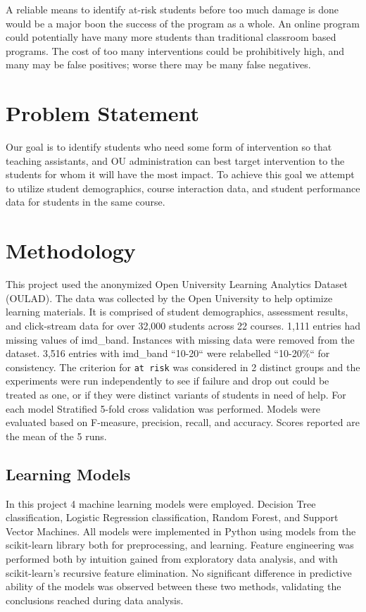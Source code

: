 \documentclass{article}
\begin{document}
A reliable means to identify at-risk students before too much
damage is done would be a major boon the success of the program as a whole. An online program could potentially 
have many more students than traditional classroom based programs. The cost of too many interventions could be 
prohibitively high, and many may be false positives; worse there may be many false negatives.

\section{Problem Statement}
Our goal is to identify students who need some form of intervention so that teaching assistants, and OU
 administration can best target intervention to the students for whom it will have the most impact. To achieve
 this goal we attempt to utilize student demographics, course interaction data, and student performance data for
 students in the same course.

\section{Methodology}
This project used the anonymized Open University Learning Analytics Dataset (OULAD). The data was collected by the Open University to help optimize learning materials. It is comprised of student demographics, assessment results, and click-stream data for over 32,000 students across 22 courses. 1,111 entries had missing values of imd\_band. Instances with missing data were removed from the dataset. 3,516 entries with imd\_band ``10-20`` were relabelled ``10-20\%`` for consistency. The criterion for \texttt{at risk} was considered in 2 distinct groups and the experiments were run independently to see if failure and drop out could be treated as one, or if they were distinct variants of students in need of help. For each model Stratified 5-fold cross validation was performed. Models were evaluated based on F-measure, precision, recall, and accuracy. Scores reported are the mean of the 5 runs.\\

\subsection{Learning Models}
In this project 4 machine learning models were employed. Decision Tree classification, Logistic Regression classification, Random Forest, and Support Vector Machines. All models were implemented in Python using models from the scikit-learn library both for preprocessing, and learning. Feature engineering was performed both by intuition gained from exploratory data analysis, and with scikit-learn's recursive feature elimination. No significant difference in predictive ability of the models was observed between these two methods, validating the conclusions reached during data analysis.
\end{document}
